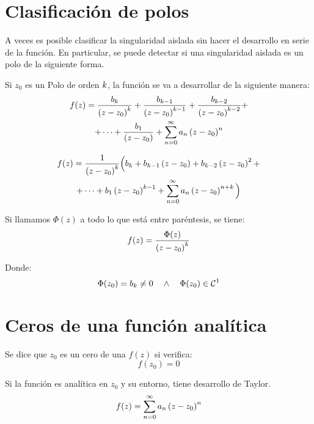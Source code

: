 \documentclass[a5paper,12pt,twoside]{book}
\begin{document}
\section{Clasificación de polos}

A veces es posible clasificar la singularidad aislada sin hacer el desarrollo en serie de la función.
En particular, se puede detectar si una singularidad aislada es un polo de la siguiente forma.

Si $z_0$ es un Polo de orden $k$, la función se va a desarrollar de la siguiente manera:
\begin{multline*}
    f(z) = \frac{b_k}{\left(z-z_0\right)^k} + \frac{b_{k-1}}{\left(z-z_0\right)^{k-1}} + \frac{b_{k-2}}{\left(z-z_0\right)^{k-2}} +
    \\
    + \dots + \frac{b_1}{\left(z-z_0\right)} + \sum_{n=0}^\infty a_n \left(z-z_0\right)^n
\end{multline*}

\begin{multline*}
    f(z) = \frac{1}{\left(z-z_0\right)^k} \Big( b_k + b_{k-1} \left(z-z_0\right) + b_{k-2} \left(z-z_0\right)^2 +
    \\
    + \dots + b_1 \left(z-z_0\right)^{k-1} + \sum_{n=0}^\infty a_n \left(z-z_0\right)^{n+k} \Big)
\end{multline*}

Si llamamos $\Phi(z)$ a todo lo que está entre paréntesis, se tiene:
\begin{equation*}
    f(z) = \frac{\Phi(z)}{\left(z-z_0\right)^k}
\end{equation*}

Donde:
\begin{equation*}
    \Phi (z_0) = b_k \neq 0 \quad \land \quad \Phi (z_0) \in \mathcal{C}^{1}
\end{equation*}


\section{Ceros de una función analítica}

Se dice que $z_0$ es un cero de una $f(z)$ si verifica:
\begin{equation*}
    f(z_0)=0
\end{equation*}

Si la función es analítica en $z_0$ y su entorno, tiene desarrollo de Taylor.
\begin{equation*}
    f(z) = \sum_{n=0}^\infty a_n \left(z-z_0\right)^n
\end{equation*}
\end{document}
